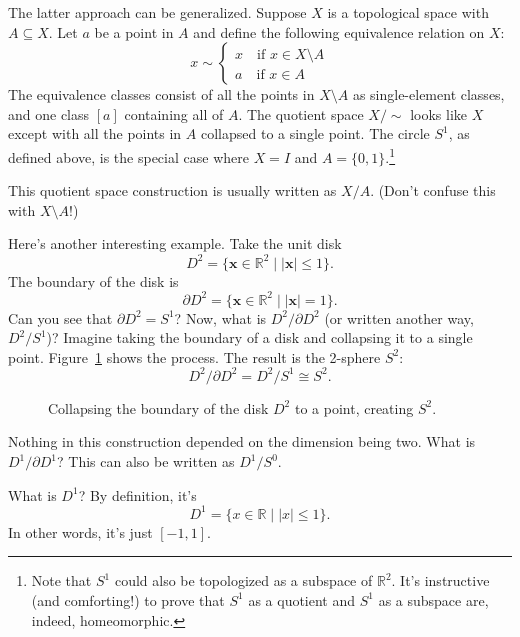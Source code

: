 \documentclass[12pt]{article}
\begin{document}
The latter approach can be generalized. Suppose $X$ is a topological space with $A \subseteq X$. Let $a$ be a point in $A$ and define the following equivalence relation on $X$:
\[
	x \sim
    \begin{cases}
    	x \quad \text{if } x \in X \setminus A \\
        a \quad \text{if } x \in A
    \end{cases}
\]
The equivalence classes consist of all the points in $X \setminus A$ as single-element classes, and one class $[a]$ containing all of $A$. The quotient space $X/\!\sim$ looks like $X$ except with all the points in $A$ collapsed to a single point. The circle $S^{1}$, as defined above, is the special case where $X = I$ and $A = \{0, 1\}$.\footnote{Note that $S^{1}$ could also be topologized as a subspace of $\mathbb{R}^{2}$. It's instructive (and comforting!) to prove that $S^{1}$ as a quotient and $S^{1}$ as a subspace are, indeed, homeomorphic.}

This quotient space construction is usually written as $X/A$. (Don't confuse this with $X \setminus A$!)

Here's another interesting example. Take the unit disk
\[
	D^{2} = \{\mathbf{x} \in \mathbb{R}^{2} \mid | \mathbf{x} | \leq 1\}.
\]
The boundary of the disk is
\[
	\partial D^{2} = \{\mathbf{x} \in \mathbb{R}^{2} \mid | \mathbf{x} | = 1\}.
\]
Can you see that $\partial D^{2} = S^{1}$? Now, what is $D^{2}/\partial D^{2}$ (or written another way, $D^{2}/S^{1}$)? Imagine taking the boundary of a disk and collapsing it to a single point. Figure~\ref{F:D2_S2} shows the process. The result is the 2-sphere $S^{2}$:
\[
	D^{2}/\partial D^{2} = D^{2}/S^{1} \cong S^{2}.
\]

\begin{figure}[ht]
\centering

\caption{Collapsing the boundary of the disk $D^{2}$ to a point, creating $S^{2}$.}
\label{F:D2_S2}
\end{figure}

Nothing in this construction depended on the dimension being two. What is $D^{1}/\partial D^{1}$? This can also be written as $D^{1}/S^{0}$. 

What is $D^{1}$? By definition, it's
\[
	D^{1} = \{x \in \mathbb{R} \mid | x| \leq 1\}.
\]
In other words, it's just $[-1,1]$.
\end{document}
